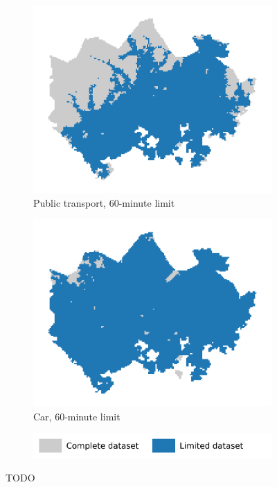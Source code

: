 \begin{figure}[H]
\begin{subfigure}[b]{0.5\textwidth}
		\includegraphics[width=\textwidth]{visual/figures/ttm/tt_limit_pt}
		\caption{Public transport, 60-minute limit}
		\label{fig:limit pt}
	\end{subfigure}%
	\hfill
	\begin{subfigure}[b]{0.5\textwidth}
		\includegraphics[width=\textwidth]{visual/figures/ttm/tt_limit_car}
		\caption{Car, 60-minute limit}
		\label{fig:limit car}
	\end{subfigure}%
	\hfill
	\begin{subfigure}[b]{0.55\textwidth}
		\includegraphics[width=\textwidth]{visual/figures/ttm/tt_limit_legend}
	\end{subfigure}%
	\caption{TODO}
	\label{fig:tt limits}
\end{figure}

